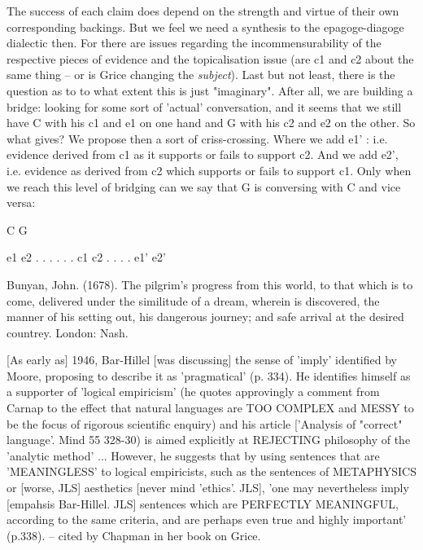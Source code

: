 \documentclass[10pt,titlepage]{book}
\begin{document}
 The success of each claim does depend on the strength and virtue of  their 
own corresponding backings. But we feel we need a synthesis to the  
epagoge-diagoge dialectic then. For there are issues regarding the  
incommensurability of the respective pieces of evidence and the topicalisation  issue (are 
c1 and c2 about the same thing -- or is Grice changing the  {\it subject}). 
Last but not least, there is the question as to to what extent this  is just 
"imaginary". After all, we are building a bridge: looking for some sort  of 
'actual' conversation, and it seems that we still have C with his c1 and e1  
on one hand and G with his c2 and e2 on the other. So what gives? We propose  
then a sort of criss-crossing. Where we add e1' : i.e. evidence derived  
from c1 as it supports or fails to support c2. And we add e2', i.e.  evidence 
as derived from c2 which supports or fails to support c1.  Only when we 
reach this level of bridging can we say that G is  conversing with C and vice 
versa:
 
                    C                   G
 
  e1                                                e2
      .                                           .
        .                                     .
           .                               .
                c1                    c2
                   .                      .
                       .               .
                        e1'   e2'
 
 
Bunyan,  John. (1678). The pilgrim's progress from this world,  to that 
which is to come, delivered under  the similitude of a dream, wherein is 
discovered, the manner of his setting out,  his dangerous journey; and safe 
arrival at the desired countrey. London:  Nash.

[As early as] 1946, Bar-Hillel [was discussing] the sense of 'imply'  
identified by Moore, proposing to describe it as 'pragmatical' (p. 334).  He 
identifies himself as a supporter of 'logical empiricism' (he  quotes 
approvingly a comment from Carnap to the effect that  natural languages are TOO 
COMPLEX and MESSY to be the focus of rigorous  scientific enquiry) and his 
article ['Analysis of "correct"  language'. Mind 55 328-30) is aimed explicitly at 
REJECTING philosophy of  the 'analytic method' ... However, he suggests 
that by using sentences that are  'MEANINGLESS' to logical empiricists, such as 
the sentences of METAPHYSICS or  [worse, JLS] aesthetics [never mind 
'ethics'. JLS], 'one may nevertheless  imply [empahsis Bar-Hillel. JLS] 
sentences which are PERFECTLY MEANINGFUL,  according to the same criteria, and are 
perhaps even true and highly important'  (p.338). -- cited by Chapman in her 
book on Grice.
\end{document}
